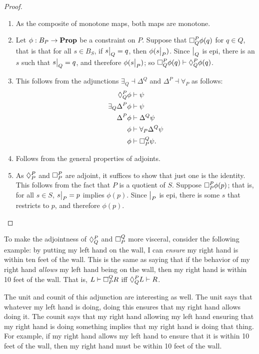    \begin{proof}
    ~
    \begin{enumerate}
        \item As the composite of monotone maps, both maps are monotone.
        \item Let $\phi : B_P \to \Prop$ be a constraint on $P$. Suppose that $\ensure{P}{Q}\phi(q)$ for $q \in Q$, that is that for all $s \in B_S$, if $\rest{s}{Q} = q$, then $\phi(\rest{s}{P})$. Since $\rest{}{Q}$ is epi, there is an $s$ such that $\rest{s}{Q} = q$, and therefore $\phi(\rest{s}{P})$; so $\ensure{P}{Q}\phi(q) \vdash \allows{P}{Q}\phi(q)$.
        \item This follows from the adjunctions $\exists_Q \dashv \Delta^Q$ and $\Delta^P \dashv \forall_P$ as follows:
        \begin{align*}
            \allows{P}{Q} \phi &\vdash \psi \\ 
            \exists_Q \Delta^P \phi &\vdash \psi \\
            \Delta^P \phi &\vdash \Delta^Q \psi \\ 
            \phi &\vdash \forall_P \Delta^Q \psi \\
            \phi &\vdash \ensure{Q}{P} \psi.
        \end{align*}
        \item Follows from the general properties of adjoints.
        \item As $\allows{P}{P}$ and $\ensure{P}{P}$ are adjoint, it suffices to show that just one is the identity. This follows from the fact that $P$ is a quotient of $S$. Suppose $\ensure{P}{P}\phi(p)$; that is, for all $s \in S$, $\rest{s}{P} = p$ implies $\phi(p)$. Since $\rest{}{P}$ is epi, there is some $s$ that restricts to $p$, and therefore $\phi(p)$. \qedhere
        
    \end{enumerate}
    \end{proof}
    
 To make the adjointness of $\allows{P}{Q}$ and $\ensure{Q}{P}$ more visceral, consider the following example: by putting my left hand on the wall, I can \emph{ensure} my right hand is within ten feet of the wall. This is the same as saying that if the behavior of my right hand \emph{allows} my left hand being on the wall, then my right hand is within 10 feet of the wall. That is, $L\vdash\ensure{Q}{P}R$ iff $\allows{P}{Q}L\vdash R$.
    
    The unit and counit of this adjunction are interesting as well. The unit
    says that whatever my left hand is doing, doing this ensures that my right
    hand allows doing it. The counit says that my right hand allowing my left hand ensuring that my right hand is doing something implies
    that my right hand is doing that thing. For example, if my right hand allows
    my left hand to ensure that it is within 10 feet of the wall, then my right hand must be within 10 feet of the wall.
    
